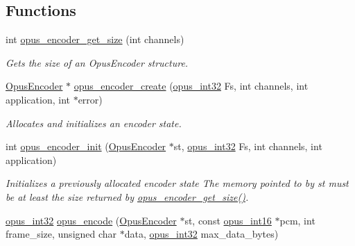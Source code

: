 \subsection*{Functions}
\begin{DoxyCompactItemize}
\item 
int \hyperlink{group__opus__encoder_gaefeb7dc1d6e3b59dea5ea674c86e9c18}{opus\_\-encoder\_\-get\_\-size} (int channels)
\begin{DoxyCompactList}\small\item\em Gets the size of an {\ttfamily OpusEncoder} structure. \item\end{DoxyCompactList}\item 
\hyperlink{group__opus__encoder_gaf461a3ef2f10c2fe8b994a176f06c9bd}{OpusEncoder} $\ast$ \hyperlink{group__opus__encoder_gaa89264fd93c9da70362a0c9b96b9ca88}{opus\_\-encoder\_\-create} (\hyperlink{opus__types_8h_aa4d309d6f80b99dbabebc8f98879ab9a}{opus\_\-int32} Fs, int channels, int application, int $\ast$error)
\begin{DoxyCompactList}\small\item\em Allocates and initializes an encoder state. \item\end{DoxyCompactList}\item 
int \hyperlink{group__opus__encoder_ga515db1c267a7421dacaad3610f79eb79}{opus\_\-encoder\_\-init} (\hyperlink{group__opus__encoder_gaf461a3ef2f10c2fe8b994a176f06c9bd}{OpusEncoder} $\ast$st, \hyperlink{opus__types_8h_aa4d309d6f80b99dbabebc8f98879ab9a}{opus\_\-int32} Fs, int channels, int application)
\begin{DoxyCompactList}\small\item\em Initializes a previously allocated encoder state The memory pointed to by st must be at least the size returned by \hyperlink{group__opus__encoder_gaefeb7dc1d6e3b59dea5ea674c86e9c18}{opus\_\-encoder\_\-get\_\-size()}. \item\end{DoxyCompactList}\item 
\hyperlink{opus__types_8h_aa4d309d6f80b99dbabebc8f98879ab9a}{opus\_\-int32} \hyperlink{group__opus__encoder_gad2d6bf6a9ffb6674879d7605ed073e25}{opus\_\-encode} (\hyperlink{group__opus__encoder_gaf461a3ef2f10c2fe8b994a176f06c9bd}{OpusEncoder} $\ast$st, const \hyperlink{opus__types_8h_acc9ed7cf60479eb81f9648c6ec27dc26}{opus\_\-int16} $\ast$pcm, int frame\_\-size, unsigned char $\ast$data, \hyperlink{opus__types_8h_aa4d309d6f80b99dbabebc8f98879ab9a}{opus\_\-int32} max\_\-data\_\-bytes)

\end{DoxyCompactItemize}
